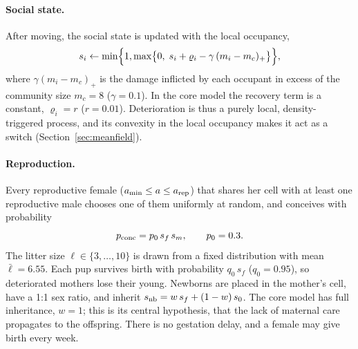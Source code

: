 \paragraph{Social state.}
After moving, the social state is updated with the local occupancy,
\begin{equation}
  s_i\leftarrow\min\Bigl\{1,\max\bigl\{0,\;s_i+\varrho_i-\gamma\,(m_i-m_c)_+\bigr\}\Bigr\},
  \label{eq:model-social}
\end{equation}
where $\gamma(m_i-m_c)_+$ is the damage inflicted by each occupant in excess of the community size
$m_c=8$ ($\gamma=0.1$). In the core model the recovery term is a constant, $\varrho_i=r$ ($r=0.01$).
Deterioration is thus a purely local, density-triggered process, and its convexity in the local
occupancy makes it act as a switch (Section~\ref{sec:meanfield}).

\paragraph{Reproduction.}
Every reproductive female ($a_{\min}\le a\le a_{\rm rep}$) that shares her cell with at least one
reproductive male chooses one of them uniformly at random, and conceives with probability
\begin{equation}
  p_{\rm conc}=p_0\,s_f\,s_m,\qquad p_0=0.3 .
  \label{eq:model-repro}
\end{equation}
The litter size $\ell\in\{3,\dots,10\}$ is drawn from a fixed distribution with mean $\bar\ell=6.55$.
Each pup survives birth with probability $q_0\,s_f$ ($q_0=0.95$), so deteriorated mothers lose their
young. Newborns are placed in the mother's cell, have a 1:1 sex ratio, and inherit
$s_{\rm nb}=w\,s_f+(1-w)\,s_0$. The core model has full inheritance, $w=1$; this is its central
hypothesis, that the lack of maternal care propagates to the offspring.
There is no gestation delay, and a female may give birth every week.

